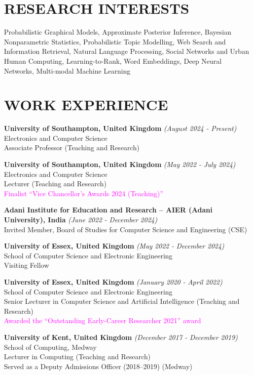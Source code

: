 \documentclass[margin]{res}
\begin{document}
\begin{resume} 
 
\section{RESEARCH INTERESTS} 
Probabilistic Graphical Models, Approximate Posterior Inference, Bayesian Nonparametric Statistics, Probabilistic Topic Modelling, Web Search and Information Retrieval, Natural Language Processing, Social Networks and Urban Human Computing, Learning-to-Rank, Word Embeddings, Deep Neural Networks, Multi-modal Machine Learning

\section{WORK EXPERIENCE}
{\bf University of Southampton, United Kingdom} \hfill \textit{(August 2024 - Present)}\\
Electronics and Computer Science\\
Associate Professor (Teaching and Research)

{\bf University of Southampton, United Kingdom} \hfill \textit{(May 2022 - July 2024)}\\
Electronics and Computer Science\\
Lecturer (Teaching and Research)\\
\textcolor{magenta}{Finalist ``Vice Chancellor's Awards 2024 (Teaching)''}

{\bf Adani Institute for Education and Research -- AIER (Adani University), India} \hfill \textit{(June 2022 - December 2024)}\\
Invited Member, Board of Studies for Computer Science and Engineering (CSE)

{\bf University of Essex, United Kingdom} \hfill \textit{(May 2022 - December 2024)}\\
School of Computer Science and Electronic Engineering\\
Visiting Fellow

{\bf University of Essex, United Kingdom} \hfill \textit{(January 2020 - April 2022)}\\
School of Computer Science and Electronic Engineering\\
Senior Lecturer in Computer Science and Artificial Intelligence (Teaching and Research) \\
\textcolor{magenta}{Awarded the ``Outstanding Early-Career Researcher 2021'' award}

{\bf University of Kent, United Kingdom} \hfill \textit{(December 2017 - December 2019)}\\
School of Computing, Medway\\
Lecturer in Computing (Teaching and Research)\\
Served as a Deputy Admissions Officer (2018--2019) (Medway)


\end{resume}
\end{document}
